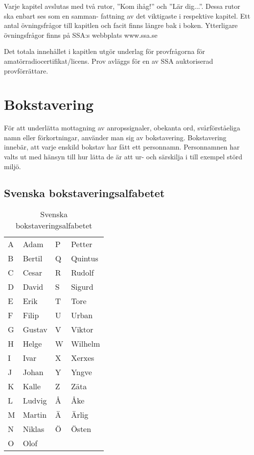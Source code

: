 
Varje kapitel avslutas med två rutor, ”Kom ihåg!” och ”Lär dig...”.
Dessa rutor ska enbart ses som en samman- fattning av det viktigaste i
respektive kapitel. Ett antal övningsfrågor till kapitlen och facit
finns längre bak i boken. Ytterligare övningsfrågor finns på SSA:s
webbplats www.ssa.se

Det totala innehållet i kapitlen utgör underlag för provfrågorna för
amatörradiocertifikat/licens. Prov avläggs för en av SSA auktoriserad
provförrättare.

\section{Bokstavering}

För att underlätta mottagning av anropssignaler, obekanta ord,
svårförståeliga namn eller förkortningar, använder man sig av
bokstavering. Bokstavering innebär, att varje enskild bokstav har fått
ett personnamn. Personnamnen har valts ut med hänsyn till hur lätta de
är att ur- och särskilja i till exempel störd miljö.

\subsection{Svenska bokstaveringsalfabetet}

\begin{table}[h]
  \begin{tabular}{ll|ll}
    A & Adam   & P & Petter  \\
    B & Bertil & Q & Quintus \\
    C & Cesar  & R & Rudolf  \\
    D & David  & S & Sigurd  \\
    E & Erik   & T & Tore    \\
    F & Filip  & U & Urban   \\
    G & Gustav & V & Viktor  \\
    H & Helge  & W & Wilhelm \\
    I & Ivar   & X & Xerxes  \\
    J & Johan  & Y & Yngve   \\
    K & Kalle  & Z & Zäta    \\
    L & Ludvig & Å & Åke     \\
    M & Martin & Ä & Ärlig   \\
    N & Niklas & Ö & Östen   \\
    O & Olof   &   &         \\
  \end{tabular}
  \caption{Svenska bokstaveringsalfabetet}
  \label{tab:sv-bokstavering}
\end{table}

